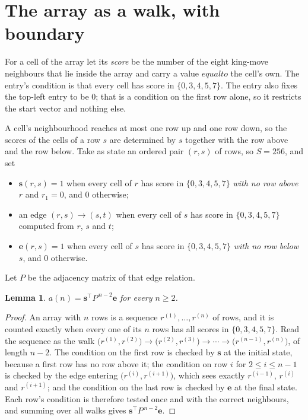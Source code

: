 \documentclass[11pt,a4paper]{article}
\theoremstyle{plain}
\newtheorem{lemma}[theorem]{Lemma}
\theoremstyle{definition}
\begin{document}
\section{The array as a walk, with boundary}

For a cell of the array let its \emph{score} be the number of the eight king-move neighbours that lie inside
the array and carry a value $equal to$ the cell's own. The entry's condition is that every cell
has score in $\{0,3,4,5,7\}$. The entry also fixes the top-left entry to be $0$; that is a condition on the first row alone, so it restricts the start vector and nothing else.

A cell's neighbourhood reaches at most one row up and one row down, so the scores of the
cells of a row $s$ are determined by $s$ together with the row above and the row below.
Take as state an ordered pair $(r,s)$ of rows, so $S=256$, and set
\begin{itemize}
\item $\mathbf{s}(r,s)=1$ when every cell of $r$ has score in $\{0,3,4,5,7\}$ \emph{with no row
above $r$} and $r_1=0$, and $0$ otherwise;
\item an edge $(r,s)\to(s,t)$ when every cell of $s$ has score in $\{0,3,4,5,7\}$ computed from
$r$, $s$ and $t$;
\item $\mathbf{e}(r,s)=1$ when every cell of $s$ has score in $\{0,3,4,5,7\}$ \emph{with no row
below $s$}, and $0$ otherwise.
\end{itemize}
Let $P$ be the adjacency matrix of that edge relation.

\begin{lemma}\label{lem:walk}
$a(n)=\mathbf{s}^{\!\top}P^{\,n-2}\mathbf{e}$ for every $n\ge2$.
\end{lemma}

\begin{proof}
An array with $n$ rows is a sequence $r^{(1)},\dots,r^{(n)}$ of rows, and it is counted
exactly when every one of its $n$ rows has all scores in $\{0,3,4,5,7\}$. Read the sequence as the
walk $\bigl(r^{(1)},r^{(2)}\bigr)\to\bigl(r^{(2)},r^{(3)}\bigr)\to\cdots\to
\bigl(r^{(n-1)},r^{(n)}\bigr)$, of length $n-2$. The condition on the first row is
checked by $\mathbf{s}$ at the initial state, because a first row has no row above it; the
condition on row $i$ for $2\le i\le n-1$ is checked by the edge entering
$\bigl(r^{(i)},r^{(i+1)}\bigr)$, which sees exactly $r^{(i-1)}$, $r^{(i)}$ and
$r^{(i+1)}$; and the condition on the last row is checked by $\mathbf{e}$ at the final
state. Each row's condition is therefore tested once and with the correct neighbours, and
summing over all walks gives $\mathbf{s}^{\!\top}P^{\,n-2}\mathbf{e}$.
\end{proof}
\end{document}
